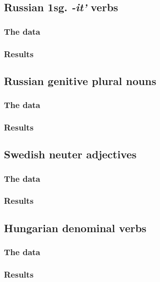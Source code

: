 \documentclass{upenndiss}
\begin{document}
\subsection{Russian 1sg. \emph{-it'} verbs}

\subsubsection{The data}

\subsubsection{Results}

\subsection{Russian genitive plural nouns}

\subsubsection{The data}

\subsubsection{Results}

\subsection{Swedish neuter adjectives}

\subsubsection{The data}

\subsubsection{Results}

\subsection{Hungarian denominal verbs}

\subsubsection{The data}

\subsubsection{Results}
\end{document}
